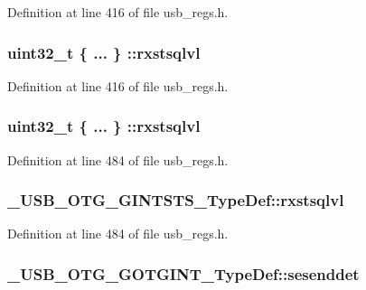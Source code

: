 Definition at line 416 of file usb\-\_\-regs.\-h.

\hypertarget{group___u_s_b___o_t_g___d_r_i_v_e_r_ga79d76af4c253f46b614c435c728c0ab2}{
\subsubsection[{rxstsqlvl}]{\setlength{\rightskip}{0pt plus 5cm}uint32\-\_\-t \{ ... \} \-::rxstsqlvl}}\label{group___u_s_b___o_t_g___d_r_i_v_e_r_ga79d76af4c253f46b614c435c728c0ab2}


Definition at line 416 of file usb\-\_\-regs.\-h.

\hypertarget{group___u_s_b___o_t_g___d_r_i_v_e_r_ga9eb127eeb2eea196b32c6d1c9d9a674a}{
\subsubsection[{rxstsqlvl}]{\setlength{\rightskip}{0pt plus 5cm}uint32\-\_\-t \{ ... \} \-::rxstsqlvl}}\label{group___u_s_b___o_t_g___d_r_i_v_e_r_ga9eb127eeb2eea196b32c6d1c9d9a674a}


Definition at line 484 of file usb\-\_\-regs.\-h.

\hypertarget{group___u_s_b___o_t_g___d_r_i_v_e_r_ga5804e5c8afb57b10e1fd90dd4ad3286f}{
\subsubsection[{rxstsqlvl}]{ \-\_\-\-U\-S\-B\-\_\-\-O\-T\-G\-\_\-\-G\-I\-N\-T\-S\-T\-S\-\_\-\-Type\-Def\-::rxstsqlvl}}\label{group___u_s_b___o_t_g___d_r_i_v_e_r_ga5804e5c8afb57b10e1fd90dd4ad3286f}


Definition at line 484 of file usb\-\_\-regs.\-h.

\hypertarget{group___u_s_b___o_t_g___d_r_i_v_e_r_gac879190d50dfae7a98b21236d524b7da}{
\subsubsection[{sesenddet}]{ \-\_\-\-U\-S\-B\-\_\-\-O\-T\-G\-\_\-\-G\-O\-T\-G\-I\-N\-T\-\_\-\-Type\-Def\-::sesenddet}}\label{group___u_s_b___o_t_g___d_r_i_v_e_r_gac879190d50dfae7a98b21236d524b7da}


